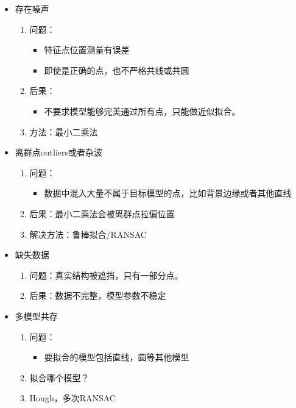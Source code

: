 \documentclass[UTF8]{ctexart}
\begin{document}
\begin{itemize}
    \item 存在噪声
    \begin{enumerate}
        \item 问题：
        \begin{itemize}
            \item 特征点位置测量有误差
            \item 即使是正确的点，也不严格共线或共圆
        \end{itemize}
        \item 后果：
        \begin{itemize}
            \item 不要求模型能够完美通过所有点，只能做近似拟合。
        \end{itemize}
        \item 方法：最小二乘法
    \end{enumerate}
    \item 离群点outliers或者杂波
    \begin{enumerate}
        \item 问题：
        \begin{itemize}
            \item 数据中混入大量不属于目标模型的点，比如背景边缘或者其他直线
        \end{itemize}
        \item 后果：最小二乘法会被离群点拉偏位置
        \item 解决方法：鲁棒拟合/RANSAC
    \end{enumerate}
    \item 缺失数据
    \begin{enumerate}
        \item 问题：真实结构被遮挡，只有一部分点。
        \item 后果：数据不完整，模型参数不稳定
    \end{enumerate}
    \item 多模型共存
    \begin{enumerate}
        \item 问题：
        \begin{itemize}
            \item 要拟合的模型包括直线，圆等其他模型
        \end{itemize}
        \item 拟合哪个模型？
        \item Hough，多次RANSAC
    \end{enumerate}
\end{itemize}
\end{document}
